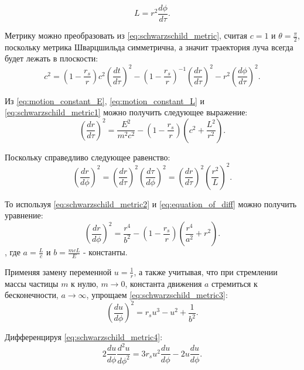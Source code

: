 \begin{equation}
\label{eq:motion_constant_L}
    L = r^2\frac{d\phi}{d\tau}.
\end{equation}

Метрику можно преобразовать из \eqref{eq:schwarzschild_metric}, считая $c = 1$ и $\theta=\frac{\pi}{2}$, поскольку метрика Шварцшильда симметрична, а значит траектория луча всегда будет лежать в плоскости:
\begin{equation}
\label{eq:schwarzschild_metric1}
    c^2 = (1-\frac{r_s}{r})c^2(\frac{dt}{d\tau})^2 - (1-\frac{r_s}{r})^{-1}(\frac{dr}{d\tau})^2 - r^2(\frac{d\phi}{d\tau})^2.
\end{equation}

Из \eqref{eq:motion_constant_E}, \eqref{eq:motion_constant_L} и \eqref{eq:schwarzschild_metric1} можно получить следующее выражение:
\begin{equation}
\label{eq:schwarzschild_metric2}
    (\frac{dr}{d\tau})^2 = \frac{E^2}{m^2c^2} - (1-\frac{r_s}{r})(c^2+\frac{L^2}{r^2}).
\end{equation}

Поскольку справедливо следующее равенство:
\begin{equation}
\label{eq:equation_of_diff}
    (\frac{dr}{d\phi})^2 = (\frac{dr}{d\tau})^2(\frac{d\tau}{d\phi})^2 = (\frac{dr}{d\tau})^2(\frac{r^2}{L})^2.
\end{equation}

То используя \eqref{eq:schwarzschild_metric2} и \eqref{eq:equation_of_diff} можно получить уравнение:
\begin{equation}
\label{eq:schwarzschild_metric3}
    (\frac{dr}{d\phi})^2 = \frac{r^4}{b^2} - (1-\frac{r_s}{r})(\frac{r^4}{a^2} + r^2).
\end{equation}
, где $a = \frac{L}{c}$ и $b = \frac{mcL}{E}$ - константы.

Применяя замену переменной $u = \frac{1}{r}$, а также учитывая, что при стремлении массы частицы $m$ к нулю, $m \longrightarrow 0$, константа движения $a$ стремиться к бесконечности, $a \longrightarrow \infty$, упрощаем \eqref{eq:schwarzschild_metric3}:
\begin{equation}
\label{eq:schwarzschild_metric4}
    (\frac{du}{d\phi})^2 = r_su^3 - u^2 + \frac{1}{b^2}.
\end{equation}

Дифференцируя \eqref{eq:schwarzschild_metric4}:
\begin{equation}
\label{eq:schwarzschild_metric5}
    2\frac{du}{d\phi}\frac{d^2u}{d\phi^2} = 3r_su^2\frac{du}{d\phi} - 2u\frac{du}{d\phi}.
\end{equation}

